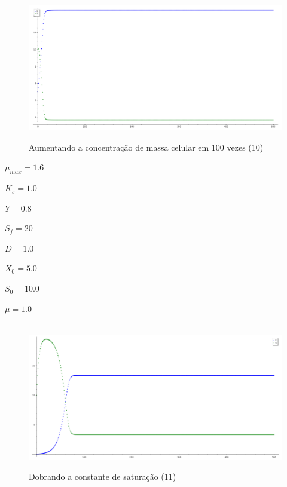 \documentclass{article}
\begin{document}
\begin{figure}[H]
        \centering
        \hbox{\hspace{1.0em} \includegraphics[scale=0.5]{Modelo_10.png}} 
        \caption*{Aumentando a concentração de massa celular em 100 vezes (10)}
\end{figure}
\vspace{-7mm}
\begin{itemize}
\begin{multicols}{4}
    \item $\mu_{max} = 1.6$ 
    \item $K_s = 1.0$ 
\columnbreak    
    \item $Y = 0.8$ 
    \item $S_f = 20$ 
\columnbreak    
    \item $D = 1.0$ 
    \item $X_0 = 5.0$ 
\columnbreak    
    \item $S_0 = 10.0$ 
    \item $\mu = 1.0$
\end{multicols}
\end{itemize}
\begin{figure}[H]
        \centering
        \hbox{\hspace{1.0em} \includegraphics[scale=0.5]{Modelo_11.png}} 
        \caption*{Dobrando a constante de saturação (11)}
\end{figure}
\end{document}
